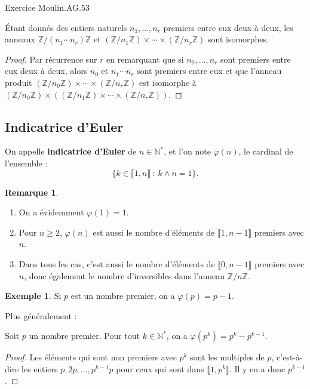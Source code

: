 \documentclass[french]{article}
\newcommand{\N}{\mathbb{N}}
\newcommand{\Z}{\mathbb{Z}}
\newcommand{\st}{^*}
\theoremstyle{plain}
\theoremstyle{definition}
\newtheorem*{ex}{Exemple}
\newtheorem*{rmq}{Remarque}
\theoremstyle{remark}
\begin{document}
Exercice Moulin.AG.53

\begin{cor}{}%
	Étant donnés des entiers naturels $n_1,\ldots,n_r$ premiers entre eux deux à deux, les anneaux $\Z/(n_1\cdots n_r)\Z$ et $(\Z/n_1\Z)\times\cdots\times(\Z/n_r\Z)$ sont isomorphes.
\end{cor}
\begin{proof}
	Par récurrence sur $r$ en remarquant que si $n_0,\ldots,n_r$ sont premiers entre eux deux à deux, alors $n_0$ et $n_1\cdots n_r$ sont premiers entre eux et que l'anneau produit $(\Z/n_0\Z)\times\cdots\times(\Z/n_r\Z)$ est isomorphe à $(\Z/n_0\Z)\times\left((\Z/n_1\Z)\times\cdots\times(\Z/n_r\Z)\right)$.
\end{proof}

\subsection{Indicatrice d'Euler}

\begin{dfn}
	On appelle \textbf{indicatrice d'Euler} de $n\in\N\st$, et l'on note $\varphi(n)$, le cardinal de l'ensemble :
	$$\{k\in\llbracket1,n\rrbracket\ :\ k\wedge n=1\}.$$
\end{dfn}

\begin{rmq}
	\begin{enumerate}
		\item On a évidemment $\varphi(1)=1$.
		\item Pour $n\geqslant 2$, $\varphi(n)$ est aussi le nombre d'éléments de $\llbracket1,n-1\rrbracket$ premiers avec $n$.
		\item Dans tous les cas, c'est aussi le nombre d'éléments de $\llbracket0,n-1\rrbracket$ premiers avec $n$, donc également le nombre d'inversibles dans l'anneau $\Z/n\Z$.
	\end{enumerate}
\end{rmq}

\begin{ex}
	Si $p$ est un nombre premier, on a $\varphi(p)=p-1$.
\end{ex}

Plus généralement :

\begin{prop}
	Soit $p$ un nombre premier. Pour tout $k\in\N\st$, on a $\varphi(p^k)=p^{k}-p^{k-1}$.
\end{prop}
\begin{proof}
	Les éléments qui sont non premiers avec $p^k$ sont les multiples de $p$, c'est-à-dire les entiers $p,2p,\ldots,p^{k-1}p$ pour ceux qui sont dans $\llbracket1,p^k\rrbracket$. Il y en a donc $p^{k-1}$.
\end{proof}
\end{document}
